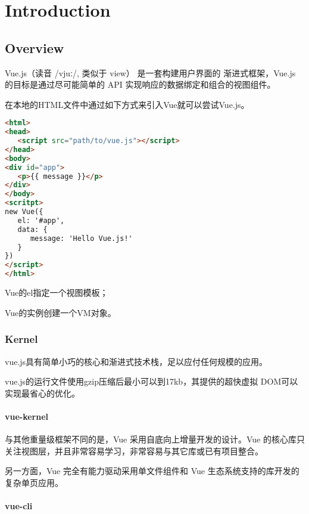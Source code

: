 \part{Introduction}


\chapter{Overview}

Vue.js（读音 /vjuː/, 类似于 view） 是一套构建用户界面的 渐进式框架，Vue.js 的目标是通过尽可能简单的 API 实现响应的数据绑定和组合的视图组件。

在本地的HTML文件中通过如下方式来引入Vue就可以尝试Vue.js。

\begin{lstlisting}[language=HTML]
<html>
<head>
   <script src="path/to/vue.js"></script>
</head>
<body>
<div id="app">
   <p>{{ message }}</p>
</div>
</body>
<scritpt>
new Vue({
   el: '#app',
   data: {
      message: 'Hello Vue.js!'
   }
})
</script>
</html>
\end{lstlisting}

\begin{compactitem}
\item Vue的el指定一个视图模板；
\item Vue的实例创建一个VM对象。
\end{compactitem}

\section{Kernel}

vue.js具有简单小巧的核心和渐进式技术栈，足以应付任何规模的应用。

vue.js的运行文件使用gzip压缩后最小可以到17kb，其提供的超快虚拟 DOM可以实现最省心的优化。



\subsection{vue-kernel}

与其他重量级框架不同的是，Vue 采用自底向上增量开发的设计。Vue 的核心库只关注视图层，并且非常容易学习，非常容易与其它库或已有项目整合。

另一方面，Vue 完全有能力驱动采用单文件组件和 Vue 生态系统支持的库开发的复杂单页应用。

\subsection{vue-cli}


